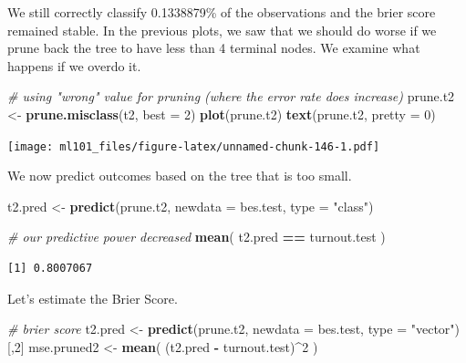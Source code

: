 \documentclass[]{article}
\newenvironment{Shaded}{\begin{snugshade}}{\end{snugshade}}
\newcommand{\CommentTok}[1]{\textcolor[rgb]{0.56,0.35,0.01}{\textit{#1}}}
\newcommand{\DataTypeTok}[1]{\textcolor[rgb]{0.13,0.29,0.53}{#1}}
\newcommand{\DecValTok}[1]{\textcolor[rgb]{0.00,0.00,0.81}{#1}}
\newcommand{\KeywordTok}[1]{\textcolor[rgb]{0.13,0.29,0.53}{\textbf{#1}}}
\newcommand{\NormalTok}[1]{#1}
\newcommand{\OperatorTok}[1]{\textcolor[rgb]{0.81,0.36,0.00}{\textbf{#1}}}
\newcommand{\StringTok}[1]{\textcolor[rgb]{0.31,0.60,0.02}{#1}}
\begin{document}
We still correctly classify 0.1338879\% of the observations and the brier score remained stable. In the previous plots, we saw that we should do worse if we prune back the tree to have less than 4 terminal nodes. We examine what happens if we overdo it.

\begin{Shaded}
\begin{Highlighting}[]
\CommentTok{# using "wrong" value for pruning (where the error rate does increase)}
\NormalTok{prune.t2 <-}\StringTok{ }\KeywordTok{prune.misclass}\NormalTok{(t2, }\DataTypeTok{best =} \DecValTok{2}\NormalTok{)}
\KeywordTok{plot}\NormalTok{(prune.t2)}
\KeywordTok{text}\NormalTok{(prune.t2, }\DataTypeTok{pretty =} \DecValTok{0}\NormalTok{)}
\end{Highlighting}
\end{Shaded}

\texttt{[image: ml101\_files/figure-latex/unnamed-chunk-146-1.pdf]}

We now predict outcomes based on the tree that is too small.

\begin{Shaded}
\begin{Highlighting}[]
\NormalTok{t2.pred <-}\StringTok{ }\KeywordTok{predict}\NormalTok{(prune.t2, }\DataTypeTok{newdata =}\NormalTok{ bes.test, }\DataTypeTok{type =} \StringTok{"class"}\NormalTok{)}

\CommentTok{# our predictive power decreased}
\KeywordTok{mean}\NormalTok{( t2.pred }\OperatorTok{==}\StringTok{ }\NormalTok{turnout.test )}
\end{Highlighting}
\end{Shaded}

\begin{verbatim}
[1] 0.8007067
\end{verbatim}

Let's estimate the Brier Score.

\begin{Shaded}
\begin{Highlighting}[]
\CommentTok{# brier score}
\NormalTok{t2.pred <-}\StringTok{ }\KeywordTok{predict}\NormalTok{(prune.t2, }\DataTypeTok{newdata =}\NormalTok{ bes.test, }\DataTypeTok{type =} \StringTok{"vector"}\NormalTok{)[,}\DecValTok{2}\NormalTok{]}
\NormalTok{mse.pruned2 <-}\StringTok{ }\KeywordTok{mean}\NormalTok{( (t2.pred }\OperatorTok{-}\StringTok{ }\NormalTok{turnout.test)}\OperatorTok{^}\DecValTok{2}\NormalTok{ ) }
\end{Highlighting}
\end{Shaded}
\end{document}
